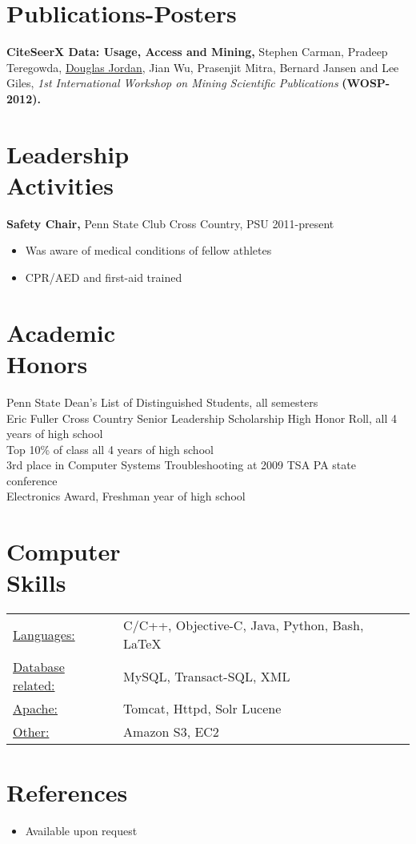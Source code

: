 \documentclass[margin]{res}
\begin{document}
\begin{resume}
\section{Publications-Posters}
{\bf CiteSeerX Data: Usage, Access and Mining,} Stephen Carman, Pradeep Teregowda, \underline{Douglas Jordan}, Jian Wu, Prasenjit Mitra, Bernard Jansen and Lee Giles, \emph{1st International Workshop on Mining Scientific Publications} {\bf (WOSP-2012).}

\section{Leadership \\ Activities}
{\bf Safety Chair,} Penn State Club Cross Country, PSU \hfill 2011-present
\begin{itemize} \itemsep -2pt
\item Was aware of medical conditions of fellow athletes
\item CPR/AED and first-aid trained
\end{itemize}

\section{Academic \\ Honors} 
Penn State Dean's List of Distinguished Students, all semesters \\
Eric Fuller Cross Country Senior Leadership Scholarship
High Honor Roll, all 4 years of high school \\
Top 10\% of class all 4 years of high school \\
3rd place in Computer Systems Troubleshooting at 2009 TSA PA state conference \\
Electronics Award, Freshman year of high school \\

\section{Computer \\ Skills}
\begin{tabular}{l p{3in}}
\underline{Languages:} & C/C++, Objective-C, Java, Python, Bash, LaTeX \\
\underline{Database related:} & MySQL, Transact-SQL, XML \\
\underline{Apache:} & Tomcat, Httpd, Solr Lucene \\
\underline{Other:} & Amazon S3, EC2
\end{tabular}

\section{References}
\begin{itemize} \itemsep -2pt
\item Available upon request
\end{itemize}
\end{resume}
\end{document}
